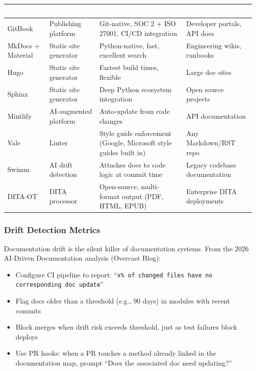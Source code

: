 \documentclass[11pt,letterpaper]{article}
\newcommand{\tableheader}[1]{\textbf{\sffamily\textcolor{white}{#1}}}
\begin{document}
\begin{center}
\begin{tabularx}{\textwidth}{L{3cm}L{3cm}XL{2.5cm}}
\toprule
{}
\tableheader{Tool} & \tableheader{Category} & \tableheader{Strengths} & \tableheader{Best For} \\
\midrule
GitBook & Publishing platform & Git-native, SOC 2 + ISO 27001, CI/CD integration & Developer portals, API docs \\
MkDocs + Material & Static site generator & Python-native, fast, excellent search & Engineering wikis, runbooks \\
Hugo & Static site generator & Fastest build times, flexible & Large doc sites \\
Sphinx & Static site generator & Deep Python ecosystem integration & Open source projects \\
Mintlify & AI-augmented platform & Auto-update from code changes & API documentation \\
Vale & Linter & Style guide enforcement (Google, Microsoft style guides built in) & Any Markdown/RST repo \\
Swimm & AI drift detection & Attaches docs to code logic at commit time & Legacy codebase documentation \\
DITA-OT & DITA processor & Open-source, multi-format output (PDF, HTML, EPUB) & Enterprise DITA deployments \\
\bottomrule
\end{tabularx}
\end{center}

\subsubsection{Drift Detection Metrics}

Documentation drift is the silent killer of documentation systems. From the 2026 AI-Driven Documentation analysis (Overcast Blog):
\begin{itemize}[leftmargin=*]
  \item Configure CI pipeline to report: ``\texttt{x\% of changed files have no corresponding doc update}''
  \item Flag docs older than a threshold (e.g., 90 days) in modules with recent commits
  \item Block merges when drift risk exceeds threshold, just as test failures block deploys
  \item Use PR hooks: when a PR touches a method already linked in the documentation map, prompt ``Does the associated doc need updating?''
\end{itemize}
\end{document}
